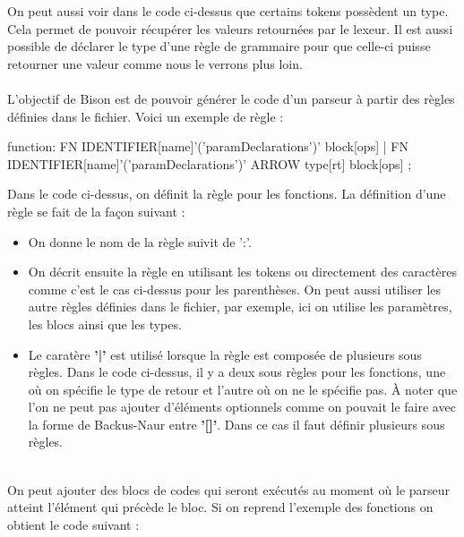 \documentclass[a4paper]{article}%
\begin{document}
On peut aussi voir dans le code ci-dessus que certains tokens possèdent un type.
Cela permet de pouvoir récupérer les valeurs retournées par le lexeur. Il est
aussi possible de déclarer le type d'une règle de grammaire pour que celle-ci
puisse retourner une valeur comme nous le verrons plus loin.\\~\\


L'objectif de Bison est de pouvoir générer le code d'un parseur à partir des
règles définies dans le fichier. Voici un exemple de règle :

\begin{code}[language=c++]
function:
        FN IDENTIFIER[name]'('paramDeclarations')' block[ops]
        |
        FN IDENTIFIER[name]'('paramDeclarations')' ARROW type[rt] block[ops]
        ;
\end{code}\leavevmode\newline

Dans le code ci-dessus, on définit la règle pour les fonctions. La définition
d'une règle se fait de la façon suivant :

\begin{itemize}
  \item On donne le nom de la règle suivit de ':'.
  \item On décrit ensuite la règle en utilisant les tokens ou directement des
    caractères comme c'est le cas ci-dessus pour les parenthèses. On peut aussi
    utiliser les autre règles définies dans le fichier, par exemple, ici on
    utilise les paramètres, les blocs ainsi que les types.
  \item Le caratère \textbf{'|'} est utilisé lorsque la règle est composée de
    plusieurs sous règles. Dans le code ci-dessus, il y a deux sous règles pour
    les fonctions, une où on spécifie le type de retour et l'autre où on ne le
    spécifie pas. À noter que l'on ne peut pas ajouter d'éléments optionnels
    comme on pouvait le faire avec la forme de Backus-Naur entre \textbf{'[]'}.
    Dans ce cas il faut définir plusieurs sous règles.
\end{itemize}~\\

On peut ajouter des blocs de codes qui seront exécutés au moment où le parseur
atteint l'élément qui précède le bloc. Si on reprend l'exemple des fonctions on
obtient le code suivant :

\leavevmode\newline
\end{document}
